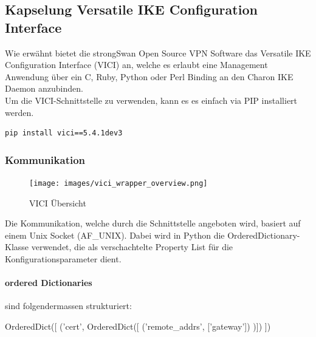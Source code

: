 \subsection{Kapselung Versatile IKE Configuration Interface}
Wie erwähnt bietet die strongSwan Open Source VPN Software das Versatile
IKE Configuration Interface (VICI) \cite{vici} an, welche es erlaubt eine Management Anwendung über ein C, Ruby, Python oder Perl Binding an den Charon
IKE Daemon anzubinden.\\
Um die VICI-Schnittstelle zu verwenden, kann es es einfach via \Gls{PIP} installiert werden.\\
\begin{lstlisting}[style=BashInputStyle]
	pip install vici==5.4.1dev3
\end{lstlisting}
\medskip

\subsubsection{Kommunikation}
\noindent
\begin{minipage}[t]{0.5\textwidth}
    \vspace{0pt}
    \begin{figure}[H]
        \centering
        \texttt{[image: images/vici\_wrapper\_overview.png]}
        \caption[VICI Übersicht]{VICI Übersicht}
    \end{figure}
    \hfill
\end{minipage}   
\noindent\begin{minipage}[t]{0.5\textwidth}
\vspace{0pt}
Die Kommunikation, welche durch die Schnittstelle angeboten wird, basiert auf einem Unix Socket (AF\_UNIX). Dabei wird in Python die OrderedDictionary-Klasse verwendet, die als verschachtelte Property List für die Konfigurationsparameter dient. \\
\end{minipage}
\hfill


\paragraph{ordered Dictionaries}\label{orderedDictionary}sind folgendermassen strukturiert:
\begin{python}
OrderedDict([
	('cert', OrderedDict([
		('remote_addrs', ['gateway'])
	)])
])
\end{python}

